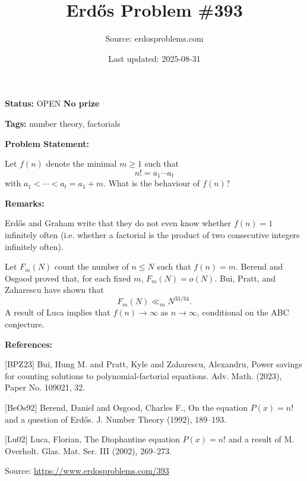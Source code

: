 \documentclass{article}
\title{Erd\H{o}s Problem \#393}
\date{Last updated: 2025-08-31}
\author{Source: erdosproblems.com}
\begin{document}
\maketitle

\noindent\textbf{Status:} OPEN \quad \textbf{No prize}

\noindent\textbf{Tags:} number theory, factorials

\medskip
\noindent\textbf{Problem Statement:}

Let $f(n)$ denote the minimal $m\geq 1$ such that\[n! = a_1\cdots a_t\]with $a_1<\cdots <a_t=a_1+m$. What is the behaviour of $f(n)$?

\bigskip
\noindent\textbf{Remarks:}

Erd\H{o}s and Graham write that they do not even know whether $f(n)=1$ infinitely often (i.e. whether a factorial is the product of two consecutive integers infinitely often).

Let $F_m(N)$ count the number of $n\leq N$ such that $f(n)=m$. Berend and Osgood \cite{BeOs92} proved that, for each fixed $m$, $F_m(N)=o(N)$. Bui, Pratt, and Zaharescu \cite{BPZ23} have shown that\[F_m(N)\ll_m N^{33/34}.\]A result of Luca \cite{Lu02} implies that $f(n)\to \infty$ as $n\to \infty$, conditional on the ABC conjecture.

\bigskip
\noindent\textbf{References:}

[BPZ23] Bui, Hung M. and Pratt, Kyle and Zaharescu, Alexandru, Power savings for counting solutions to polynomial-factorial
equations. Adv. Math. (2023), Paper No. 109021, 32.
 
 [BeOs92] Berend, Daniel and Osgood, Charles F., On the equation {$P(x)=n!$} and a question of {E}rd\H{o}s. J. Number Theory (1992), 189--193.
 
 [Lu02] Luca, Florian, The {D}iophantine equation {$P(x)=n!$} and a result of {M}.
{O}verholt. Glas. Mat. Ser. III (2002), 269--273.

\bigskip
\noindent\small{Source: \url{https://www.erdosproblems.com/393}}
\end{document}

